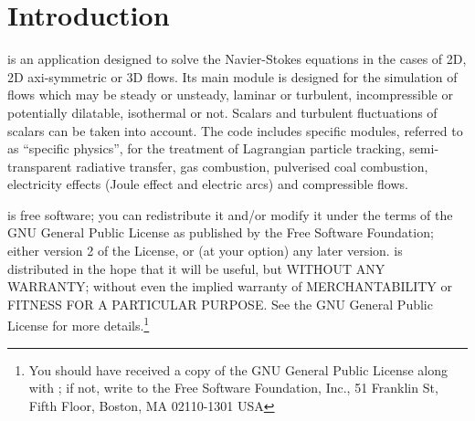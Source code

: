 
%
%
%
%


\nopagebreak
\section{Introduction}

\CS is an application designed to solve the Navier-Stokes
equations in the cases of 2D, 2D axi-symmetric or 3D flows. Its main module is
designed for the simulation of flows which may be steady or
unsteady, laminar or turbulent, incompressible or potentially dilatable,
isothermal or not. Scalars and turbulent fluctuations of scalars can be taken into
account. The code includes specific modules, referred to as ``specific physics'',
for the treatment of Lagrangian particle tracking, semi-transparent radiative transfer,
gas combustion, pulverised coal combustion,
electricity effects (Joule effect and electric arcs) and compressible flows.

\CS is free software; you can redistribute it
and/or modify it under the terms of the GNU General Public License
as published by the Free Software Foundation; either version 2 of
the License, or (at your option) any later version.
\CS is distributed in the hope that it will be
useful, but WITHOUT ANY WARRANTY; without even the implied warranty
of MERCHANTABILITY or FITNESS FOR A PARTICULAR PURPOSE.  See the
GNU General Public License for more details.\footnote{You should have
received a copy of the GNU General Public License
along with \CS; if not, write to the
Free Software Foundation, Inc.,
51 Franklin St, Fifth Floor,
Boston, MA  02110-1301  USA}


